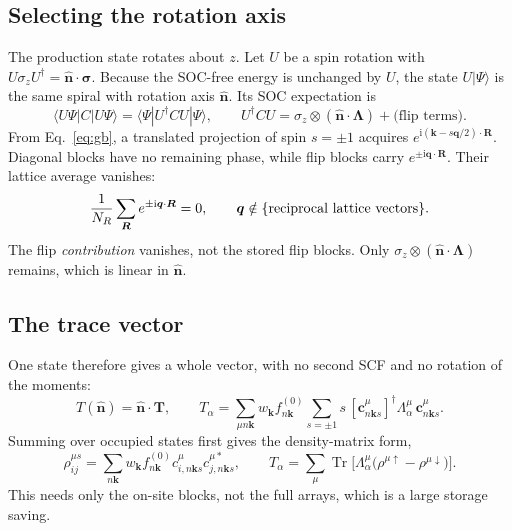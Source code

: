 \documentclass[11pt,a4paper]{article}
\numberwithin{equation}{section}
\newcommand{\vct}[1]{\bm{#1}}
\newcommand{\nh}{\hat{\vct n}}
\newcommand{\qh}{\vct q}
\newcommand{\kh}{\vct k}
\newcommand{\ii}{\mathrm i}
\newcommand{\Tr}{\operatorname{Tr}}
\newcommand{\code}[1]{\texttt{\detokenize{#1}}}
\begin{document}
\subsection{Selecting the rotation axis}

The production state rotates about $z$. Let $U$ be a spin rotation with
$U\sigma_zU^\dagger=\nh\cdot\vct\sigma$. Because the SOC-free energy is
unchanged by $U$, the state $U|\Psi\rangle$ is the same spiral with rotation
axis $\nh$. Its SOC expectation is
\begin{equation}\label{eq:rotate}
 \langle U\Psi|C|U\Psi\rangle=\langle\Psi|U^\dagger CU|\Psi\rangle,
 \qquad
 U^\dagger CU=\sigma_z\otimes(\nh\cdot\vct\Lambda)+\text{(flip terms)}.
\end{equation}
From Eq.~\eqref{eq:gb}, a translated projection of spin $s=\pm1$ acquires
$e^{\ii(\kh-s\qh/2)\cdot\vct R}$. Diagonal blocks have no remaining phase, while
flip blocks carry $e^{\pm\ii\qh\cdot\vct R}$. Their lattice average vanishes:
\begin{equation}\label{eq:average}
 \frac{1}{N_R}\sum_{\vct R}e^{\pm\ii\qh\cdot\vct R}=0,
 \qquad \qh\notin\{\hbox{reciprocal lattice vectors}\}.
\end{equation}
The flip \emph{contribution} vanishes, not the stored flip blocks. Only
$\sigma_z\otimes(\nh\cdot\vct\Lambda)$ remains, which is linear in $\nh$.

\subsection{The trace vector}

One state therefore gives a whole vector, with no second SCF and no rotation of
the moments:
\begin{equation}\label{eq:trace}
 \boxed{T(\nh)=\nh\cdot\vct T,\qquad
 T_\alpha=\sum_{\mu n\kh}w_{\kh} f^{(0)}_{n\kh}
 \sum_{s=\pm1}s\,[\vct c^\mu_{n\kh s}]^\dagger\Lambda_\alpha^\mu
 \,\vct c^\mu_{n\kh s}.}
\end{equation}
Summing over occupied states first gives the density-matrix form,
\begin{equation}\label{eq:rho}
 \rho^{\mu s}_{ij}=
 \sum_{n\kh}w_{\kh}f^{(0)}_{n\kh}
 c^\mu_{i,n\kh s}c^{\mu *}_{j,n\kh s},\qquad
 \boxed{T_\alpha=\sum_\mu
 \Tr\bigl[\Lambda_\alpha^\mu
 \bigl(\rho^{\mu\uparrow}-\rho^{\mu\downarrow}\bigr)\bigr].}
\end{equation}
This needs only the on-site \code{COCC} blocks, not the full \code{CPROJ}
arrays, which is a large storage saving.
\end{document}
